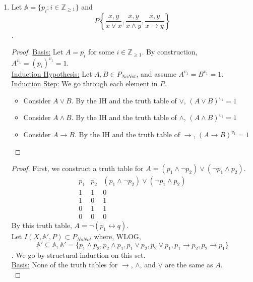 \documentclass[12pt]{article}
\begin{document}
\begin{enumerate}
        \item 
        \begin{tasks}
            \task Let $\mathbb{A}=\{p_i:i\in\mathbb{Z}_{\geq 1}\}$ and \[P\left\{\frac{x,y}{x\lor x},\frac{x,y}{x\land y},\frac{x,y}{x\to y}\right\}\].
            \task 
            \begin{proof}
                \underline{Basis:} Let $A=p_i$ for some $i\in\mathbb{Z}_{\geq 1}$. By construction, $A^{v_1}=(p_i)^{v_1}=1$.\\
                \underline{Induction Hypothesis:} Let $A, B\in P_{NoNot}$, and assume $A^{v_1}=B^{v_1}=1$.\\
                \underline{Induction Step:} We go through each element in $P$.
                \begin{itemize}
                    \item Consider $A\lor B$. By the IH and the truth table of $\lor$, $(A\lor B)^{v_1}=1$
                    \item Consider $A\land B$. By the IH and the truth table of $\land$, $(A\land B)^{v_1}=1$
                    \item Consider $A\to B$. By the IH and the truth table of $\to$, $(A\to B)^{v_1}=1$
                \end{itemize}
            \end{proof}
            \task 
            \begin{proof}
                First, we construct a truth table for $A=(p_1\land \neg p_2)\lor (\neg p_1\land p_2)$.\\
                \[\begin{array}{c|c|c}
                    p_1 & p_2 & (p_1\land \neg p_2)\lor (\neg p_1\land p_2)\\\hline
                    1 & 1 & 0\\
                    1 & 0 & 1\\
                    0 & 1 & 1\\
                    0 & 0 & 0
                \end{array}
                \]
                By this truth table, $A=\neg (p_1\leftrightarrow q)$. \\
                Let $I(X,\mathbb{A}', P)\subset P_{NoNot}$ where, WLOG, \[\mathbb{A}'\subseteq\mathbb{A}, \mathbb{A}'=\{p_1\land p_2, p_2\land p_1,p_1\lor p_2,p_2\lor p_1,p_1\to p_2, p_2\to p_1\}\]. We go by structural induction on this set.\\
                \underline{Basis:} None of the truth tables for $\to$, $\land$, and $\lor$ are the same as $A$.\\

\end{proof}
\end{tasks}
\end{enumerate}
\end{document}
